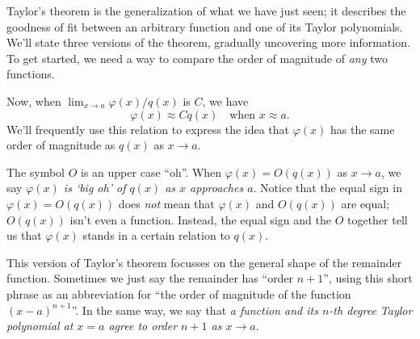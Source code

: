 {{{{        Taylor's theorem is the generalization of what we have just seen; it describes the goodness of fit between an arbitrary function and one of its Taylor polynomials.  We'll state three versions of the theorem, gradually uncovering more information.  To get started, we need a way to compare the order of magnitude of {\em any\/} two 
functions.
\begin{center}
\end{center}
Now, when $\lim_{x\to a} \varphi(x)/q(x)$ is $C$, we have \label{order}
        \[
\varphi(x) \approx C q(x) \quad \mbox{when $x \approx a$}.
\]
We'll frequently use this relation to express the idea that $\varphi(x)$ has the same order of magnitude as $q(x)$ as $x \to a$.

        The symbol $O$ is an upper case ``oh''.  
When $\varphi(x) = O(q(x))$ as $x \to a$, we say {\em $\varphi(x)$ is `big oh' of $q(x)$ as $x$ approaches $a$}.  Notice that the equal sign in $\varphi(x) = O(q(x))$ does {\em not\/} mean that $\varphi(x)$ and $O(q(x))$ are equal; $O(q(x))$ isn't even a function.  Instead, the equal sign and the $O$ together tell us that $\varphi(x)$ stands in a certain relation to $q(x)$.
\begin{center}
\end{center}


        This version of Taylor's theorem focusses 
on the general shape of the remainder function.  Sometimes we just say the remainder has ``order $n + 1$'', using this short phrase as an abbreviation for ``the order of magnitude of the function $(x - a)^{n+1}$''.  In the same way, we say that {\em a function and its $n$-th degree Taylor polynomial at $x = a$ agree to order $n+1$ as $x \to a$}.


}}}}
